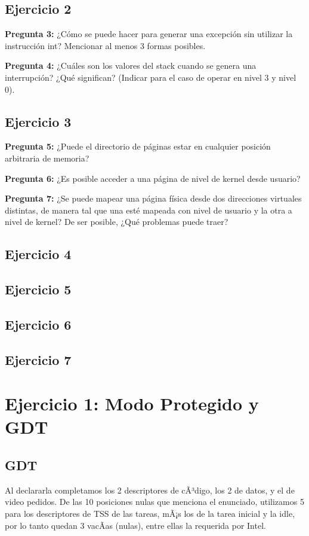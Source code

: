 \documentclass[10pt, a4paper]{article}
\begin{document}
\subsection{Ejercicio 2}
{\textbf{Pregunta 3:}} ¿Cómo se puede hacer para generar una excepción sin utilizar la instrucción int? Mencionar al menos 3 formas posibles.\newline

{\textbf{Pregunta 4:}} ¿Cuáles son los valores del stack cuando se genera una interrupción? ¿Qué significan? (Indicar para el caso de operar en nivel 3 y nivel 0).\newline


\subsection{Ejercicio 3}
{\textbf{Pregunta 5:}} ¿Puede el directorio de páginas estar en cualquier posición arbitraria de memoria?\newline

{\textbf{Pregunta 6:}} ¿Es posible acceder a una página de nivel de kernel desde usuario?\newline

{\textbf{Pregunta 7:}} ¿Se puede mapear una página física desde dos direcciones virtuales
distintas, de manera tal que una esté mapeada con nivel de usuario y la otra a nivel de kernel? De ser posible, ¿Qué problemas puede traer?\newline

\subsection{Ejercicio 4}
\subsection{Ejercicio 5}
\subsection{Ejercicio 6}
\subsection{Ejercicio 7}


\section{Ejercicio 1: Modo Protegido y GDT}
\subsection{GDT}
Al declararla completamos los 2 descriptores de cÃ³digo, los 2 de datos, y el de video pedidos. De las 10 posiciones nulas que menciona el enunciado, utilizamos 5 para los descriptores de TSS de las tareas, mÃ¡s los de la tarea inicial y la idle, por lo tanto quedan 3 vacÃ­as (nulas), entre ellas la requerida por Intel.
\end{document}
